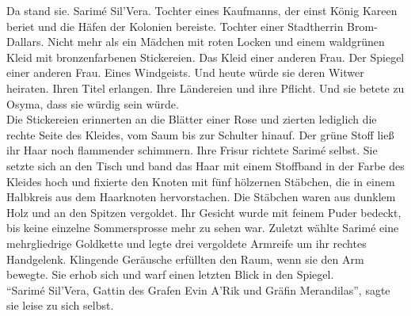 Da stand sie. Sarimé Sil'Vera. Tochter eines Kaufmanns, der einst König Kareen beriet und die 
Häfen der Kolonien bereiste. Tochter einer Stadtherrin Brom-Dallars. Nicht mehr als ein Mädchen 
mit roten Locken und einem waldgrünen Kleid mit bronzenfarbenen Stickereien. Das Kleid einer 
anderen Frau. Der Spiegel einer anderen Frau. Eines Windgeists. Und heute würde sie deren Witwer 
heiraten. Ihren Titel erlangen. Ihre Ländereien und ihre Pflicht. Und sie betete zu Osyma, dass 
sie würdig sein würde.\\
Die Stickereien erinnerten an die Blätter einer Rose und zierten lediglich die rechte Seite des 
Kleides, vom Saum bis zur Schulter hinauf. Der grüne Stoff ließ ihr Haar noch flammender 
schimmern. Ihre Frisur richtete Sarimé selbst. Sie setzte sich an den Tisch und band das Haar mit 
einem Stoffband in der Farbe des Kleides hoch und fixierte den Knoten mit fünf hölzernen Stäbchen, 
die in einem Halbkreis aus dem Haarknoten hervorstachen. Die Stäbchen waren aus dunklem Holz und an 
den Spitzen vergoldet. Ihr Gesicht wurde mit feinem Puder bedeckt, bis keine einzelne 
Sommersprosse mehr zu sehen war. Zuletzt wählte Sarimé eine mehrgliedrige Goldkette und legte drei 
vergoldete Armreife um ihr rechtes Handgelenk. Klingende Geräusche erfüllten den Raum, wenn sie den 
Arm bewegte. Sie erhob sich und warf einen letzten Blick in den Spiegel.\\
``Sarimé Sil'Vera, Gattin des Grafen Evin A'Rik und Gräfin Merandilas'', sagte sie leise zu sich 
selbst.\\


